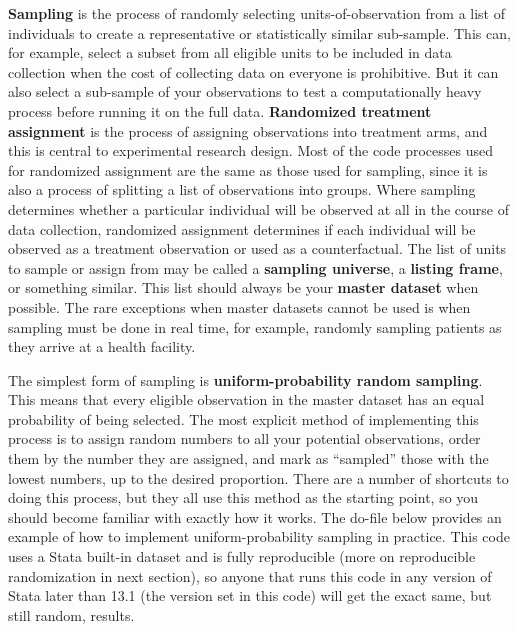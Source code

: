 \textbf{Sampling} is the process of randomly selecting units-of-observation
from a list of individuals to create a representative or statistically similar sub-sample.
This can, for example, select a subset from all eligible units
to be included in data collection when the cost of collecting data on everyone is prohibitive.
But it can also select a sub-sample of your observations to test a computationally heavy process 
before running it on the full data.
\textbf{Randomized treatment assignment} is the process of assigning observations into treatment arms,
and this is central to experimental research design.
Most of the code processes used for randomized assignment are the same as those used for sampling,
since it is also a process of splitting a list of observations into groups.
Where sampling determines whether a particular individual
will be observed at all in the course of data collection,
randomized assignment determines if each individual will be observed
as a treatment observation or used as a counterfactual.
The list of units to sample or assign from may be called a \textbf{sampling universe},
a \textbf{listing frame}, or something similar.
This list should always be your \textbf{master dataset} when possible.
The rare exceptions when master datasets cannot be used is when sampling must be done in real time,
for example, randomly sampling patients as they arrive at a health facility.

The simplest form of sampling is 
\textbf{uniform-probability random sampling}.
This means that every eligible observation in the master dataset
has an equal probability of being selected.
The most explicit method of implementing this process
is to assign random numbers to all your potential observations,
order them by the number they are assigned,
and mark as ``sampled'' those with the lowest numbers, up to the desired proportion.
There are a number of shortcuts to doing this process,
but they all use this method as the starting point,
so you should become familiar with exactly how it works.
The do-file below provides an example of
how to implement uniform-probability sampling in practice.
This code uses a Stata built-in dataset and is fully reproducible
(more on reproducible randomization in next section),
so anyone that runs this code in any version of Stata later than 13.1
(the version set in this code)
will get the exact same, but still random, results.

